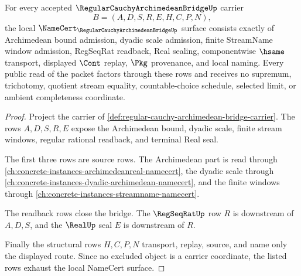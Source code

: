 \begin{theorem}
\label{thm:regular-cauchy-archimedean-bridge-namecert-obligations}
For every accepted $\RegularCauchyArchimedeanBridgeUp$ carrier
$$
B=(A,D,S,R,E,H,C,P,N),
$$
the local $\NameCert_{\RegularCauchyArchimedeanBridgeUp}$ surface consists exactly of Archimedean bound admission, dyadic scale admission, finite StreamName window admission, RegSeqRat readback, Real sealing, componentwise $\hsame$ transport, displayed $\Cont$ replay, $\Pkg$ provenance, and local naming. Every public read of the packet factors through these rows and receives no supremum, trichotomy, quotient stream equality, countable-choice schedule, selected limit, or ambient completeness coordinate.
\end{theorem}
\begin{proof}
Project the carrier of \autoref{def:regular-cauchy-archimedean-bridge-carrier}. The rows $A,D,S,R,E$ expose the Archimedean bound, dyadic scale, finite stream windows, regular rational readback, and terminal Real seal.

The first three rows are source rows. The Archimedean part is read through \autoref{ch:concrete-instances-archimedeanreal-namecert}, the dyadic scale through \autoref{ch:concrete-instances-dyadic-archimedean-namecert}, and the finite windows through \autoref{ch:concrete-instances-streamname-namecert}.

The readback rows close the bridge. The $\RegSeqRatUp$ row $R$ is downstream of $A,D,S$, and the $\RealUp$ seal $E$ is downstream of $R$.

Finally the structural rows $H,C,P,N$ transport, replay, source, and name only the displayed route. Since no excluded object is a carrier coordinate, the listed rows exhaust the local NameCert surface.
\end{proof}

